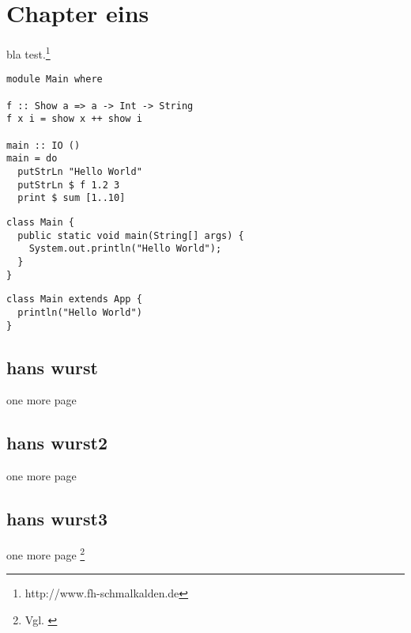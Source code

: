\chapter{Chapter eins}
bla test.\footnote{http://www.fh-schmalkalden.de}

\begin{lstlisting}[label=listinghaskell,caption=This is Haskell]
module Main where

f :: Show a => a -> Int -> String
f x i = show x ++ show i

main :: IO ()
main = do
  putStrLn "Hello World"
  putStrLn $ f 1.2 3
  print $ sum [1..10]
\end{lstlisting}

\begin{lstlisting}[label=listingjava,caption=This is Java]
class Main {
  public static void main(String[] args) {
    System.out.println("Hello World");
  }
}
\end{lstlisting}

\begin{lstlisting}[label=listingscala,caption=This is Scala]
class Main extends App {
  println("Hello World")
}
\end{lstlisting}
\section{hans wurst}
one more page

\newpage
\section{hans wurst2}
one more page

\newpage
\section{hans wurst3}
one more page \footnote{Vgl. \cite{braun:scala}}


